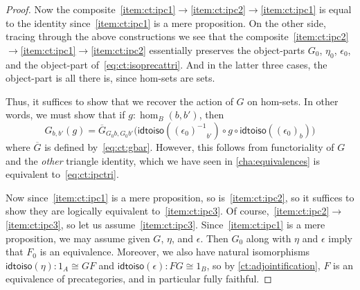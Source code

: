 \documentclass[10pt,a4paper]{article}
\newcommand{\opp}[1]{\mathord{{#1}^{-1}}}
\newcommand{\idtoiso}{\ensuremath{\mathsf{idtoiso}}\xspace}
\theoremstyle{definition}
\theoremstyle{remark}
\numberwithin{equation}{section}
\begin{document}
\begin{proof}
  Now the composite~\ref{item:ct:ipc1}$\to$\ref{item:ct:ipc2}$\to$\ref{item:ct:ipc1} is equal to the identity since~\ref{item:ct:ipc1} is a mere proposition.
  On the other side, tracing through the above constructions we see that the composite~\ref{item:ct:ipc2}$\to$\ref{item:ct:ipc1}$\to$\ref{item:ct:ipc2} essentially preserves the object-parts $G_0$, $\eta_0$, $\epsilon_0$, and the object-part of~\eqref{eq:ct:isoprecattri}.
  And in the latter three cases, the object-part is all there is, since hom-sets are sets.

  Thus, it suffices to show that we recover the action of $G$ on hom-sets.
  In other words, we must show that if $g:\hom_B(b,b')$, then
  \[ G_{b,b'}(g) =
  \overline{G}_{G_0b,G_0b'}\Big(\idtoiso(\opp{(\epsilon_0)}_{b'}) \circ g \circ \idtoiso((\epsilon_0)_b)\Big)
  \]
  where $\overline{G}$ is defined by~\eqref{eq:ct:gbar}.
  However, this follows from functoriality of $G$ and the \emph{other} triangle identity, which we have seen in \cref{cha:equivalences} is equivalent to~\eqref{eq:ct:ipctri}.

  Now since~\ref{item:ct:ipc1} is a mere proposition, so is~\ref{item:ct:ipc2}, so it suffices to show they are logically equivalent to~\ref{item:ct:ipc3}.
  Of course,~\ref{item:ct:ipc2}$\to$\ref{item:ct:ipc3}, so let us assume~\ref{item:ct:ipc3}.
  Since~\ref{item:ct:ipc1} is a mere proposition, we may assume given $G$, $\eta$, and $\epsilon$.
  Then $G_0$ along with $\eta$ and $\epsilon$ imply that $F_0$ is an equivalence.
  Moreover, we also have natural isomorphisms $\idtoiso(\eta):1_A\cong GF$ and $\idtoiso(\epsilon):FG\cong 1_B$, so by \cref{ct:adjointification}, $F$ is an equivalence of precategories, and in particular fully faithful.
\end{proof}
\end{document}
